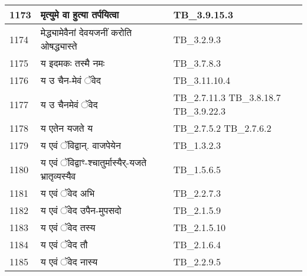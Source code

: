 \documentclass[17pt]{extarticle}
\begin{document}
\begin{longtable}{||p{0.4in}||p{4.9in}||p{0.9in}||}
    \hline
        
    1173 & मृत्युमे वा हुत्या तर्पयित्वा & TB\_3.9.15.3       \\
    
    \hline
        
    1174 & मेद्ध्यामेवैनां देवयजनीं करोति ओषद्ध्यास्ते & TB\_3.2.9.3       \\
    
    \hline
        
    1175 & य इदमकः तस्मै नमः & TB\_3.7.8.3       \\
    
    \hline
        
    1176 & य उ चैन{-}मेवं ॅवेद & TB\_3.11.10.4       \\
    
    \hline
        
    1177 & य उ चैनमेवं ॅवेद & TB\_2.7.11.3 TB\_3.8.18.7 TB\_3.9.22.3       \\
    
    \hline
        
    1178 & य एतेन यजते य & TB\_2.7.5.2 TB\_2.7.6.2       \\
    
    \hline
        
    1179 & य एवं ॅविद्वान्. वाजपेयेन & TB\_1.3.2.3       \\
    
    \hline
        
    1180 & य एवं ॅविद्वाꣳ{-}श्चातुर्मास्यैर्{-}यजते भ्रातृव्यस्यैव & TB\_1.5.6.5       \\
    
    \hline
        
    1181 & य एवं ॅवेद अभि & TB\_2.2.7.3       \\
    
    \hline
        
    1182 & य एवं ॅवेद उपैन{-}मुपसदो & TB\_2.1.5.9       \\
    
    \hline
        
    1183 & य एवं ॅवेद तस्य & TB\_2.1.5.10       \\
    
    \hline
        
    1184 & य एवं ॅवेद तौ & TB\_2.1.6.4       \\
    
    \hline
        
    1185 & य एवं ॅवेद नास्य & TB\_2.2.9.5       \\
    

\end{longtable}
\end{document}
